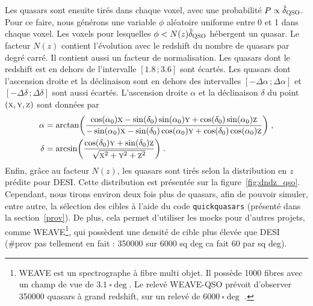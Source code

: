 \documentclass[11pt, twoside, a4paper, openright]{report}
\begin{document}
Les quasars sont ensuite tirés dans chaque voxel, avec une probabilité $P \propto \hat \delta_{\textsc{QSO}}$. Pour ce faire, nous générons une variable $\phi$ aléatoire uniforme entre 0 et 1 dans chaque voxel. Les voxels pour lesquelles $\phi < N(z) \hat \delta_{\textsc{QSO}}$ hébergent un quasar.
Le facteur $N(z)$ contient l'évolution avec le redshift du nombre de quasars par degré carré. Il contient aussi un facteur de normalisation.
Les quasars dont le redshift est en dehors de l'intervalle $[\num{1.8}\, ; \num{3.6}]$ sont écartés.
Les quasars dont l'ascension droite et la déclinaison sont en dehors des intervalles $[ - \Delta \alpha \, ; \Delta \alpha]$ et $[ - \Delta \delta \, ; \Delta \delta]$ sont aussi écartés.
L'ascension droite $\alpha$ et la déclinaison $\delta$ du point $(\textsc{x},\textsc{y},\textsc{z})$ sont données par
\begin{align}
  \label{eq:radec}
  \alpha &= \arctan(\frac{
  \cos(\alpha_0)\textsc{x} - \sin(\delta_0)\sin(\alpha_0)\textsc{y} + \cos(\delta_0)\sin(\alpha_0)\textsc{z}
  }{
  - \sin(\alpha_0)\textsc{x} - \sin(\delta_0)\cos(\alpha_0)\textsc{y} + \cos(\delta_0)\cos(\alpha_0)\textsc{z}
           }) \; ,\\
  \delta &= \arcsin(\frac{
           \cos(\delta_0)\textsc{y} + \sin(\delta_0) \textsc{z}
           }{
           \sqrt{\textsc{x}^2 + \textsc{y}^2 + \textsc{z}^2}
           }) \; .
\end{align}
Enfin, grâce au facteur $N(z)$, les quasars sont tirés selon la distribution en $z$ prédite pour DESI. Cette distribution est présentée sur la figure~\ref{fig:dndz_qso}. Cependant, nous tirons environ deux fois plus de quasars, afin de pouvoir simuler, entre autre, la sélection des cibles à l'aide du code \texttt{quickquasars} (présenté dans la section~\ref{prov}). De plus, cela permet d'utiliser les mocks pour d'autres projets, comme WEAVE\footnote{WEAVE est un spectrographe à fibre multi objet. Il possède \num{1000} fibres avec un champ de vue de $\SI{3.1}{\square\deg}$. Le relevé WEAVE-QSO prévoit d'observer \num{350000} quasars à grand redshift, sur un relevé de $\SI{6000}{\square\deg}$ \autocite{Pieri2016}.}, qui possèdent une densité de cible plus élevée que DESI (\#prov pas tellement en fait : \num{350000} sur 6000 sq deg ca fait 60 par sq deg).
\end{document}
